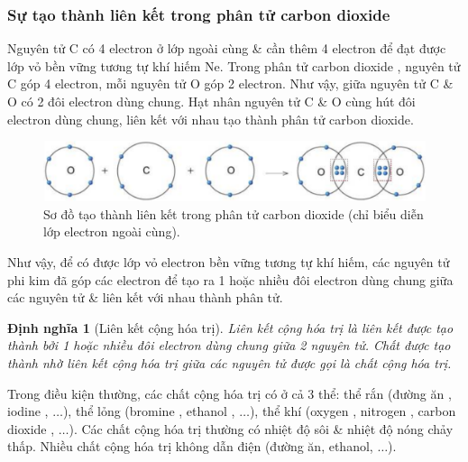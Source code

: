 \documentclass{article}
\newtheorem{dinhnghia}{Định nghĩa}
\begin{document}
\subsubsection{Sự tạo thành liên kết trong phân tử carbon dioxide}
Nguyên tử C có 4 electron ở lớp ngoài cùng \& cần thêm 4 electron để đạt được lớp vỏ bền vững tương tự khí hiếm Ne. Trong phân tử carbon dioxide , nguyên tử C góp 4 electron, mỗi nguyên tử O góp 2 electron. Như vậy, giữa nguyên tử C \& O có 2 đôi electron dùng chung. Hạt nhân nguyên tử C \& O cùng hút đôi electron dùng chung, liên kết với nhau tạo thành phân tử carbon dioxide.
\begin{figure}[H]
	\centering
	\includegraphics[scale=0.3]{carbon_dioxide}
	\caption{Sơ đồ tạo thành liên kết trong phân tử carbon dioxide  (chỉ biểu diễn lớp electron ngoài cùng).}
\end{figure}
Như vậy, để có được lớp vỏ electron bền vững tương tự khí hiếm, các nguyên tử phi kim đã góp các electron để tạo ra 1 hoặc nhiều đôi electron dùng chung giữa các nguyên tử \& liên kết với nhau thành phân tử.

\begin{dinhnghia}[Liên kết cộng hóa trị]
	\emph{Liên kết cộng hóa trị} là liên kết được tạo thành bởi 1 hoặc nhiều đôi electron dùng chung giữa 2 nguyên tử. Chất được tạo thành nhờ liên kết cộng hóa trị giữa các nguyên tử được gọi là \emph{chất cộng hóa trị}.
\end{dinhnghia}
Trong điều kiện thường, các chất cộng hóa trị có ở cả 3 thể: thể rắn (đường ăn , iodine , $\ldots$), thể lỏng (bromine , ethanol , $\ldots$), thể khí (oxygen , nitrogen , carbon dioxide , $\ldots$). Các chất cộng hóa trị thường có nhiệt độ sôi \& nhiệt độ nóng chảy thấp. Nhiều chất cộng hóa trị không dẫn điện (đường ăn, ethanol, $\ldots$).
\end{document}
